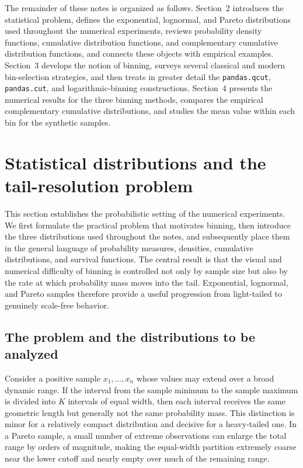 \documentclass[12pt]{article}
\numberwithin{equation}{section}
\begin{document}
The remainder of these notes is organized as follows. Section~2 introduces the statistical problem, defines the exponential, lognormal, and Pareto distributions used throughout the numerical experiments, reviews probability density functions, cumulative distribution functions, and complementary cumulative distribution functions, and connects these objects with empirical examples. Section~3 develops the notion of binning, surveys several classical and modern bin-selection strategies, and then treats in greater detail the \texttt{pandas.qcut}, \texttt{pandas.cut}, and logarithmic-binning constructions. Section~4 presents the numerical results for the three binning methods, compares the empirical complementary cumulative distributions, and studies the mean value within each bin for the synthetic samples.

\section{Statistical distributions and the tail-resolution problem}

This section establishes the probabilistic setting of the numerical experiments. We first formulate the practical problem that motivates binning, then introduce the three distributions used throughout the notes, and subsequently place them in the general language of probability measures, densities, cumulative distributions, and survival functions. The central result is that the visual and numerical difficulty of binning is controlled not only by sample size but also by the rate at which probability mass moves into the tail. Exponential, lognormal, and Pareto samples therefore provide a useful progression from light-tailed to genuinely scale-free behavior.

\subsection{The problem and the distributions to be analyzed}

Consider a positive sample $x_1,\ldots,x_n$ whose values may extend over a broad dynamic range. If the interval from the sample minimum to the sample maximum is divided into $K$ intervals of equal width, then each interval receives the same geometric length but generally not the same probability mass. This distinction is minor for a relatively compact distribution and decisive for a heavy-tailed one. In a Pareto sample, a small number of extreme observations can enlarge the total range by orders of magnitude, making the equal-width partition extremely coarse near the lower cutoff and nearly empty over much of the remaining range.
\end{document}
